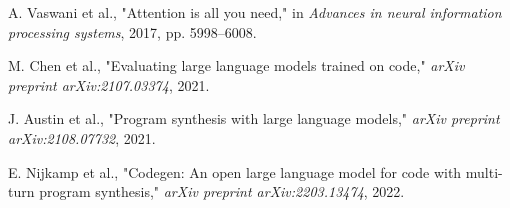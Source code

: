 \documentclass[conference]{IEEEtran}
\begin{document}
\begin{thebibliography}{1}

A. Vaswani et al., "Attention is all you need," in \textit{Advances in neural information processing systems}, 2017, pp. 5998--6008.

M. Chen et al., "Evaluating large language models trained on code," \textit{arXiv preprint arXiv:2107.03374}, 2021.

J. Austin et al., "Program synthesis with large language models," \textit{arXiv preprint arXiv:2108.07732}, 2021.

E. Nijkamp et al., "Codegen: An open large language model for code with multi-turn program synthesis," \textit{arXiv preprint arXiv:2203.13474}, 2022.

\end{thebibliography}
\end{document}
